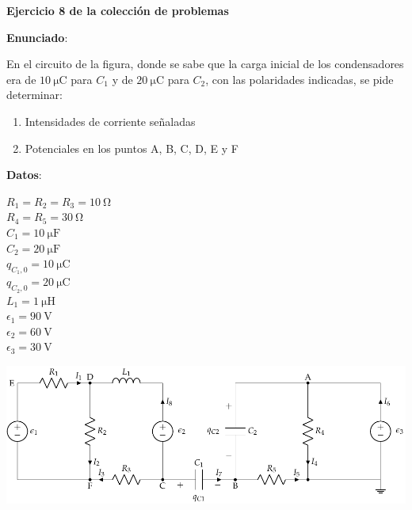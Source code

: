 \documentclass[10pt]{article}
\begin{document}
\large{\textbf{Ejercicio 8 de la colección de problemas}}

\vspace{3mm}
\large{\textbf{Enunciado}}:

\vspace{5mm}

\begin{minipage}{0.65\linewidth}
    \vspace{-24mm}
    En el circuito de la figura, donde se sabe que la carga inicial de los condensadores era de $\qty{10}{\micro\coulomb}$ para $C_1$ y de $\qty{20}{\micro\coulomb}$ para $C_2$, con las polaridades indicadas, se pide determinar:
    
    \begin{enumerate}
        \item Intensidades de corriente señaladas
        \item Potenciales en los puntos A, B, C, D, E y F
    \end{enumerate}
\end{minipage}
\hfill
\begin{minipage}{0.25\linewidth}
    \textbf{Datos}:
    \vspace{2mm}
    
    $R_1 = R_2 = R_3 = \qty{10}{\ohm}$\\
    $R_4 = R_5 = \qty{30}{\ohm}$\\
    $C_1 = \qty{10}{\micro\farad}$\\    
    $C_2 = \qty{20}{\micro\farad}$\\
    $q_{C_1,0} = \qty{10}{\micro\coulomb}$\\
    $q_{C_2,0} = \qty{20}{\micro\coulomb}$\\
    $L_1 = \qty{1}{\micro\henry}$\\
    $\epsilon_1=\qty{90}{\volt}$\\
    $\epsilon_2 = \qty{60}{\volt}$\\
    $\epsilon_3 = \qty{30}{\volt}$    
\end{minipage}

\includegraphics[scale=1.08]{figs/mallas_carga_inicial.pdf}
\end{document}
